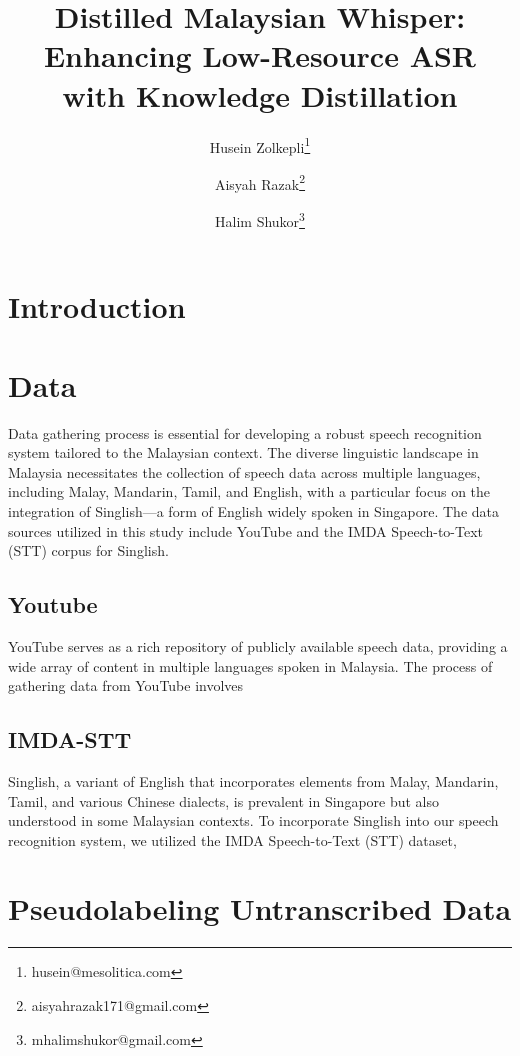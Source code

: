 \documentclass[preprint]{article}
\title{Distilled Malaysian Whisper: Enhancing Low-Resource ASR with Knowledge Distillation}
\author{
  Husein Zolkepli\thanks{husein@mesolitica.com} \and
  Aisyah Razak\thanks{aisyahrazak171@gmail.com} \and
  Halim Shukor\thanks{mhalimshukor@gmail.com} 
}
\begin{document}
\maketitle

\begin{abstract}


\end{abstract}

\section{Introduction}



\section{Data}

Data gathering process is essential for developing a robust speech recognition system tailored to the Malaysian context. The diverse linguistic landscape in Malaysia necessitates the collection of speech data across multiple languages, including Malay, Mandarin, Tamil, and English, with a particular focus on the integration of Singlish—a form of English widely spoken in Singapore. The data sources utilized in this study include YouTube and the IMDA Speech-to-Text (STT) corpus for Singlish.


\subsection{Youtube}

YouTube serves as a rich repository of publicly available speech data, providing a wide array of content in multiple languages spoken in Malaysia. The process of gathering data from YouTube involves

\subsection{IMDA-STT}

Singlish, a variant of English that incorporates elements from Malay, Mandarin, Tamil, and various Chinese dialects, is prevalent in Singapore but also understood in some Malaysian contexts. To incorporate Singlish into our speech recognition system, we utilized the IMDA Speech-to-Text (STT) dataset,

\section{Pseudolabeling Untranscribed Data}
\end{document}
